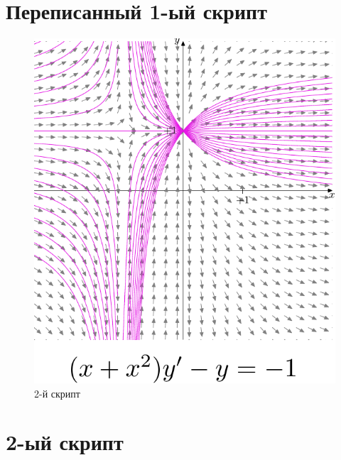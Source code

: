 \section*{Переписанный 1-ый скрипт}


\clearpage

\begin{figure}[h]
    \includegraphics{fig2-1.pdf}
    \centering
    \caption{2-й скрипт}
\end{figure}

\section*{2-ый скрипт}


\clearpage

